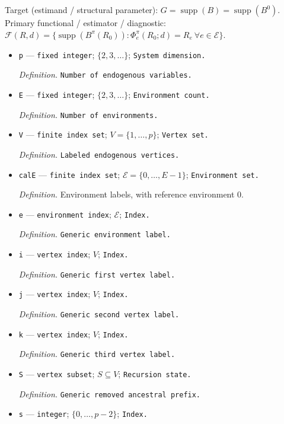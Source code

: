 \documentclass{article}
\begin{document}
Target (estimand / structural parameter): \(G=\operatorname{supp}(B)=\operatorname{supp}(B^0)\).
Primary functional / estimator / diagnostic: \(\mathcal F(R,d)=\{\operatorname{supp}(B^{\pi}(R_0)):\Phi_e^{\pi}(R_0;d)=R_e\ \forall e\in\mathcal E\}\).
\begin{itemize}
  \item \texttt{p} --- \texttt{fixed integer}; \(\{2,3,\ldots\}\); \texttt{System dimension.}
  \par\smallskip\noindent\emph{Definition.} \texttt{Number of endogenous variables.}
  \item \texttt{E} --- \texttt{fixed integer}; \(\{2,3,\ldots\}\); \texttt{Environment count.}
  \par\smallskip\noindent\emph{Definition.} \texttt{Number of environments.}
  \item \texttt{V} --- \texttt{finite index set}; \(V=\{1,\ldots,p\}\); \texttt{Vertex set.}
  \par\smallskip\noindent\emph{Definition.} \texttt{Labeled endogenous vertices.}
  \item \texttt{calE} --- \texttt{finite index set}; \(\mathcal E=\{0,\ldots,E-1\}\); \texttt{Environment set.}
  \par\smallskip\noindent\emph{Definition.} Environment labels, with reference environment \(0\).
  \item \texttt{e} --- \texttt{environment index}; \(\mathcal E\); \texttt{Index.}
  \par\smallskip\noindent\emph{Definition.} \texttt{Generic environment label.}
  \item \texttt{i} --- \texttt{vertex index}; \(V\); \texttt{Index.}
  \par\smallskip\noindent\emph{Definition.} \texttt{Generic first vertex label.}
  \item \texttt{j} --- \texttt{vertex index}; \(V\); \texttt{Index.}
  \par\smallskip\noindent\emph{Definition.} \texttt{Generic second vertex label.}
  \item \texttt{k} --- \texttt{vertex index}; \(V\); \texttt{Index.}
  \par\smallskip\noindent\emph{Definition.} \texttt{Generic third vertex label.}
  \item \texttt{S} --- \texttt{vertex subset}; \(S\subseteq V\); \texttt{Recursion state.}
  \par\smallskip\noindent\emph{Definition.} \texttt{Generic removed ancestral prefix.}
  \item \texttt{s} --- \texttt{integer}; \(\{0,\ldots,p-2\}\); \texttt{Index.}

\end{itemize}
\end{document}
